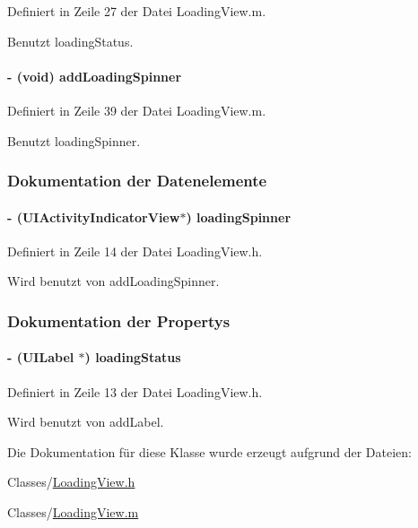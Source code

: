 Definiert in Zeile 27 der Datei LoadingView.m.

Benutzt loadingStatus.\hypertarget{interface_loading_view_a4b7cbaae54014af138245cdcd176ee45}{
\paragraph[{addLoadingSpinner}]{\setlength{\rightskip}{0pt plus 5cm}-\/ (void) addLoadingSpinner }\hfill}
\label{interface_loading_view_a4b7cbaae54014af138245cdcd176ee45}


Definiert in Zeile 39 der Datei LoadingView.m.

Benutzt loadingSpinner.

\subsubsection{Dokumentation der Datenelemente}
\hypertarget{interface_loading_view_a79c7dd7cab2fe9664dbae7d672bdc8cd}{
\paragraph[{loadingSpinner}]{\setlength{\rightskip}{0pt plus 5cm}-\/ (UIActivityIndicatorView$\ast$) {\bf loadingSpinner}}\hfill}
\label{interface_loading_view_a79c7dd7cab2fe9664dbae7d672bdc8cd}


Definiert in Zeile 14 der Datei LoadingView.h.

Wird benutzt von addLoadingSpinner.

\subsubsection{Dokumentation der Propertys}
\hypertarget{interface_loading_view_a48f535017836613ddaf6a956643afa31}{
\paragraph[{loadingStatus}]{\setlength{\rightskip}{0pt plus 5cm}-\/ (UILabel $\ast$) loadingStatus}\hfill}
\label{interface_loading_view_a48f535017836613ddaf6a956643afa31}


Definiert in Zeile 13 der Datei LoadingView.h.

Wird benutzt von addLabel.

Die Dokumentation für diese Klasse wurde erzeugt aufgrund der Dateien:\begin{DoxyCompactItemize}
\item 
Classes/\hyperlink{_loading_view_8h}{LoadingView.h}\item 
Classes/\hyperlink{_loading_view_8m}{LoadingView.m}\end{DoxyCompactItemize}
